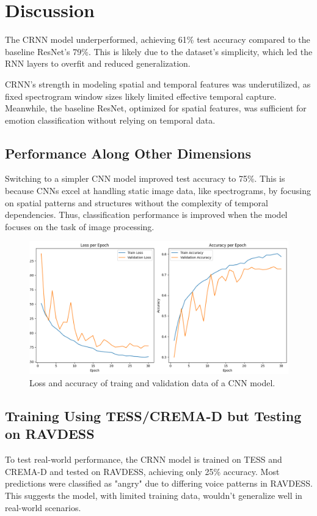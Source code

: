 \documentclass[../main.tex]{subfiles}
\begin{document}
\section{Discussion}

The CRNN model underperformed, achieving 61\% test accuracy compared to the 
baseline ResNet's 79\%. This is likely due to the dataset's simplicity, which 
led the RNN layers to overfit and reduced generalization.

CRNN's strength in modeling spatial and temporal features was underutilized, as 
fixed spectrogram window sizes likely limited effective temporal capture. 
Meanwhile, the baseline ResNet, optimized for spatial features, was sufficient for 
emotion classification without relying on temporal data.

\subsection{Performance Along Other Dimensions}

Switching to a simpler CNN model improved test accuracy to 75\%. This is because 
CNNs excel at handling static image data, like spectrograms, by focusing on 
spatial patterns and structures without the complexity of temporal dependencies. Thus, 
classification performance is improved when the model focuses on the task of 
image processing.

\begin{figure}[h]
    \centering
    \includegraphics[width=.5\linewidth]{../resources/cnn_mixed.png}
    \caption{Loss and accuracy of traing and validation data of a CNN model.}
    \label{fig:cnn_mixed}
\end{figure}

\subsection{Training Using TESS/CREMA-D but Testing on RAVDESS}

To test real-world performance, the CRNN model is trained on TESS and CREMA-D 
and tested on RAVDESS, achieving only 25\% accuracy. Most predictions were 
classified as "angry" due to differing voice patterns in RAVDESS. This 
suggests the model, with limited training data, wouldn't generalize well 
in real-world scenarios.
\end{document}
